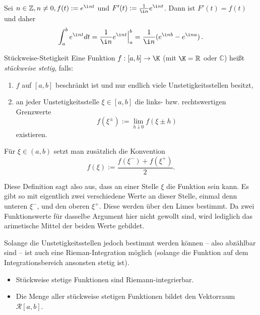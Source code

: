 \begin{beispielbox}
    Sei $n \in \mathbb{Z}, n \neq 0, f(t) := e^{\i n t}$ und $F'(t) := \frac{1}{\i n} e^{\i n t}$. Dann ist $F'(t) = f(t)$ und daher 
    $$
    \int_{a}^{b} e^{\i n t} dt = \frac{1}{\i n} e^{\i n t} \Big|_{a}^{b} = \frac{1}{\i n} (e^{\i n b} - e^{\i n a}) \, .
    $$   
\end{beispielbox}


\begin{definition}[deflabel=StueckweiseStetigkeit]{Stückweise-Stetigkeit}
    Eine Funktion $f : [a,b] \to \K$ (mit $\K = \mathbb{R}$ oder $\mathbb{C}$) heißt
    \emph{stückweise stetig}, falls:

    \begin{enumerate}
        \item $f$ auf $[a,b]$ beschränkt ist und nur endlich viele Unstetigkeitsstellen besitzt,
        \item an jeder Unstetigkeitsstelle $\xi \in [a,b]$ die links- bzw. rechtswertigen Grenzwerte
        $$
            f(\xi^\pm) := \lim_{h\downarrow 0} f(\xi \pm h)
        $$
        existieren.
    \end{enumerate}

    Für $\xi \in (a,b)$ setzt man zusätzlich die Konvention
    $$
        f(\xi) := \frac{f(\xi^-) + f(\xi^+)}{2}.
    $$
\end{definition}
Diese Definition sagt also aus, dass an einer Stelle $\xi$ die Funktion sein kann. Es gibt so mit eigentlich zwei verschiedene Werte an dieser Stelle, einmal denn unteren $\xi^-$, und den oberen $\xi^+$. Diese werden über den Limes bestimmt. Da zwei Funktionswerte für dasselbe Argument hier nicht gewollt sind, wird lediglich das arimetische Mittel der beiden Werte gebildet. 

Solange die Unstetigkeitsstellen jedoch bestimmt werden können -- also abzählbar sind -- ist auch eine Rieman-Integration möglich (solange die Funktion auf dem Integrationsbereich ansonsten stetig ist).


\begin{beispielbox}
\end{beispielbox}

\begin{bemerkungbox}
    \begin{itemize}
        \item Stückweise stetige Funktionen sind Riemann-integrierbar.
        \item Die Menge aller stückweise stetigen Funktionen bildet den Vektorraum $\mathcal{R}[a,b]$.
    \end{itemize}
\end{bemerkungbox}

